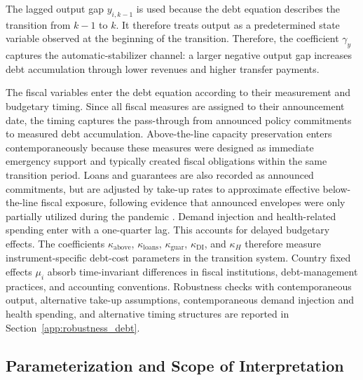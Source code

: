 \documentclass[12pt, a4paper]{article}
\begin{document}
The lagged output gap $y_{i,k-1}$ is used because the debt equation describes the transition from $k-1$ to $k$. It therefore treats output as a predetermined state variable observed at the beginning of the transition. Therefore, the coefficient $\gamma_y$ captures the automatic-stabilizer channel: a larger negative output gap increases debt accumulation through lower revenues and higher transfer payments.

The fiscal variables enter the debt equation according to their measurement and budgetary timing. Since all fiscal measures are assigned to their announcement date, the timing captures the pass-through from announced policy commitments to measured debt accumulation. Above-the-line capacity preservation enters contemporaneously because these measures were designed as immediate emergency support and typically created fiscal obligations within the same transition period. Loans and guarantees are also recorded as announced commitments, but are adjusted by take-up rates to approximate effective below-the-line fiscal exposure, following evidence that announced envelopes were only partially utilized during the pandemic \citep{esrb2021monitoring, europeanparliament2022guarantees}. Demand injection and health-related spending enter with a one-quarter lag. This accounts for delayed budgetary effects. The coefficients $\kappa_{\text{above}}$, $\kappa_{\text{loans}}$, $\kappa_{\text{guar}}$, $\kappa_{\text{DI}}$, and $\kappa_H$ therefore measure instrument-specific debt-cost parameters in the transition system. Country fixed effects $\mu_i$ absorb time-invariant differences in fiscal institutions, debt-management practices, and accounting conventions. Robustness checks with contemporaneous output, alternative take-up assumptions, contemporaneous demand injection and health spending, and alternative timing structures are reported in Section~\ref{app:robustness_debt}.


\subsection{Parameterization and Scope of Interpretation}
\label{subsec:scope}
\end{document}
